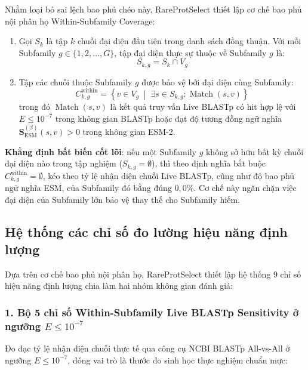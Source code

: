 Nhằm loại bỏ sai lệch bao phủ chéo này, RareProtSelect thiết lập cơ chế bao phủ nội phân họ Within-Subfamily Coverage:
\begin{enumerate}
    \item Gọi $S_k$ là tập $k$ chuỗi đại diện đầu tiên trong danh sách đồng thuận. Với mỗi Subfamily $g \in \{1, 2, \dots, G\}$, tập đại diện thực sự thuộc về Subfamily $g$ là:
    \begin{equation}
    \label{eq:within_subfamily_reps}
    S_{k, g} = S_k \cap V_g
    \end{equation}
    
    \item Tập các chuỗi thuộc Subfamily $g$ được bảo vệ bởi đại diện cùng Subfamily:
    \begin{equation}
    \label{eq:within_subfamily_covered_set}
    C_{k, g}^{\text{within}} = \left\{v \in V_g \;\middle|\; \exists s \in S_{k, g} : \operatorname{Match}(s, v)\right\}
    \end{equation}
    \noindent trong đó $\operatorname{Match}(s, v)$ là kết quả truy vấn Live BLASTp có hit hợp lệ với $E \le 10^{-7}$ trong không gian BLASTp hoặc đạt độ tương đồng ngữ nghĩa $\mathbf{S}_{\text{ESM}}^{(\beta)}(s, v) > 0$ trong không gian ESM-2.
\end{enumerate}

\noindent\textbf{Khẳng định bất biến cốt lõi}: nếu một Subfamily $g$ không sở hữu bất kỳ chuỗi đại diện nào trong tập nghiệm ($S_{k, g} = \emptyset$), thì theo định nghĩa bắt buộc $C_{k, g}^{\text{within}} = \emptyset$, kéo theo tỷ lệ nhận diện chuỗi Live BLASTp, cũng như độ bao phủ ngữ nghĩa ESM, của Subfamily đó bằng đúng $0{,}0\%$. Cơ chế này ngăn chặn việc đại diện của Subfamily lớn bảo vệ thay thế cho Subfamily hiếm.

\subsection{Hệ thống các chỉ số đo lường hiệu năng định lượng}
\label{subsec:quantitative_metrics}

Dựa trên cơ chế bao phủ nội phân họ, RareProtSelect thiết lập hệ thống $9$ chỉ số hiệu năng định lượng chia làm hai nhóm không gian đánh giá:

\subsubsection{1. Bộ 5 chỉ số Within-Subfamily Live BLASTp Sensitivity ở ngưỡng $E \le 10^{-7}$}
Đo đạc tỷ lệ nhận diện chuỗi thực tế qua công cụ NCBI BLASTp All-vs-All ở ngưỡng $E \le 10^{-7}$, đóng vai trò là thước đo sinh học thực nghiệm chuẩn mực:

